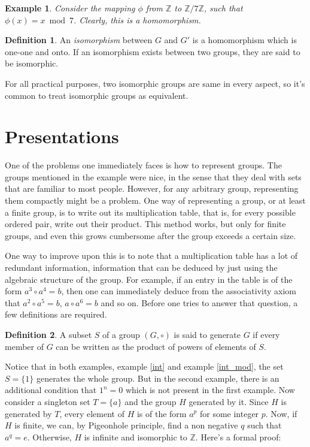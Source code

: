 \documentclass[12pt, titlepage]{article}
\newtheorem{exmp}[thm]{Example}
\theoremstyle{definition}
\newtheorem{defn}{Definition}[section]
\begin{document}
\begin{exmp}
Consider the mapping $\phi$ from $\mathbb{Z}$ to $\mathbb{Z}/7\mathbb{Z}$, such that $\phi(x) = x \bmod 7$. Clearly, this is a homomorphism.
\end{exmp}

\begin{defn}
An \emph{isomorphism} between $G$ and $G'$ is a homomorphism which is one-one and onto. If an isomorphism exists between two groups, they are said to be isomorphic.
\end{defn}

For all practical purposes, two isomorphic groups are same in every aspect, so it's common to treat isomorphic groups as equivalent.

\section{Presentations}

One of the problems one immediately faces is how to represent groups. The groups mentioned in the example were nice, in the sense that they deal with sets that are familiar to most people. However, for any arbitrary group, representing them compactly might be a problem. One way of representing a group, or at least a finite group, is to write out its multiplication table, that is, for every possible ordered pair, write out their product. This method works, but only for finite groups, and even this grows cumbersome after the group exceeds a certain size.

One way to improve upon this is to note that a multiplication table has a lot of redundant information, information that can be deduced by just using the algebraic structure of the group. For example, if an entry in the table is of the form $a^3 \circ a^4 = b$, then one can immediately deduce from the associativity axiom that $a^2 \circ a^5 = b$, $a \circ a^6 = b$ and so on. Before one tries to answer that question, a few definitions are required. \cite{johnson}

\begin{defn}
A subset $S$ of a group $(G, \circ)$ is said to generate $G$ if every member of $G$ can be written as the product of powers of elements of $S$.
\end{defn}

Notice that in both examples, example \autoref{int} and example \autoref{int_mod}, the set $S = \{1\}$ generates the whole group. But in the second example, there is an additional condition that $1^n=0$ which is not present in the first example. Now consider a singleton set $T = \{a\}$ and the group $H$ generated by it. Since $H$ is generated by $T$, every element of $H$ is of the form $a^p$ for some integer $p$. Now, if $H$ is finite, we can, by Pigeonhole principle, find a non negative $q$ such that $a^q=e$. Otherwise, $H$ is infinite and isomorphic to $\mathbb{Z}$. Here's a formal proof:
\end{document}
